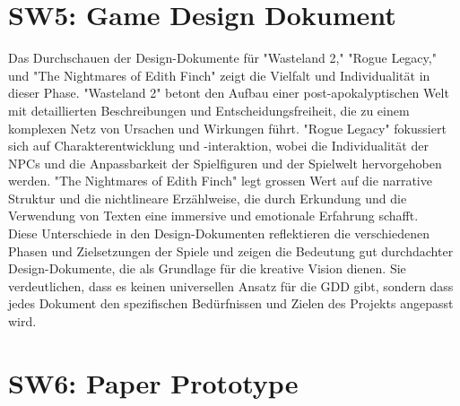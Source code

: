 \documentclass{article}
\begin{document}
\section{SW5: Game Design Dokument}

Das Durchschauen der Design-Dokumente für "Wasteland 2," "Rogue Legacy," und "The Nightmares of Edith Finch" zeigt die Vielfalt und
Individualität in dieser Phase. "Wasteland 2" betont den Aufbau einer post-apokalyptischen Welt mit detaillierten
Beschreibungen und Entscheidungsfreiheit, die zu einem komplexen Netz von Ursachen und Wirkungen führt. "Rogue Legacy" fokussiert
sich auf Charakterentwicklung und -interaktion, wobei die Individualität der NPCs und die Anpassbarkeit der Spielfiguren und der
Spielwelt hervorgehoben werden. "The Nightmares of Edith Finch" legt grossen Wert auf die narrative Struktur und die nichtlineare
Erzählweise, die durch Erkundung und die Verwendung von Texten eine immersive und emotionale Erfahrung schafft.
\\
Diese Unterschiede in den Design-Dokumenten reflektieren die verschiedenen Phasen und Zielsetzungen der Spiele und zeigen die Bedeutung gut
durchdachter Design-Dokumente, die als Grundlage für die kreative Vision dienen. Sie verdeutlichen, dass es keinen universellen
Ansatz für die GDD gibt, sondern dass jedes Dokument den spezifischen Bedürfnissen und Zielen des Projekts angepasst
wird.

\section{SW6: Paper Prototype}
\end{document}
